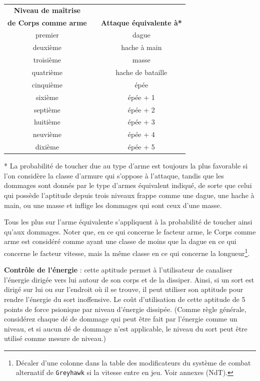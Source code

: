 \documentclass[11pt]{article}
\begin{document}
{{\parindent2cm\begin{tabular}{cp{2.5cm}c}
\textbf{Niveau de maîtrise} && \\
\textbf{de Corps comme arme} && \textbf{Attaque équivalente à*} \\
premier && dague \\
deuxième && hache à main \\
troisième && masse \\
quatrième && hache de bataille \\
cinquième && épée \\
sixième && épée + 1 \\
septième && épée + 2 \\
huitième && épée + 3 \\
neuvième && épée + 4 \\
dixième && épée + 5 \\
\end{tabular}}

\bigskip

* La probabilité de toucher due au type d'arme est toujours la plus favorable si l'on considère la classe d'armure qui s'oppose à l'attaque, tandis que les dommages sont donnés par le type d'armes équivalent indiqué, de sorte que celui qui possède l'aptitude depuis trois niveaux frappe comme une dague, une hache à main, ou une masse et inflige les dommages qui sont ceux d'une masse.

\bigskip

Tous les plus sur l'arme équivalente s'appliquent à la probabilité de toucher ainsi qu'aux dommages. Noter que, en ce qui concerne le facteur arme, le Corps comme arme est considéré comme ayant une classe de moins que la dague en ce qui concerne le facteur vitesse, mais la même classe en ce qui concerne la longueur\footnote{Décaler d'une colonne dans la table des modificateurs du système de combat alternatif de \texttt{Greyhawk} si la vitesse entre en jeu. Voir annexes (NdT).}.

\bigskip

\textbf{Contrôle de l'énergie} : cette aptitude permet à l'utilisateur de canaliser l'énergie dirigée vers lui autour de son corps et de la dissiper. Ainsi, si un sort est dirigé sur lui ou sur l'endroit où il se trouve, il peut utiliser son aptitude pour rendre l'énergie du sort inoffensive. Le coût d'utilisation de cette aptitude de 5 points de force psionique par niveau d'énergie dissipée. (Comme règle générale, considérez chaque dé de dommage qui peut être fait par l'énergie comme un niveau, et si aucun dé de dommage n'est applicable, le niveau du sort peut être utilisé comme mesure de niveau.)

}
\end{document}
